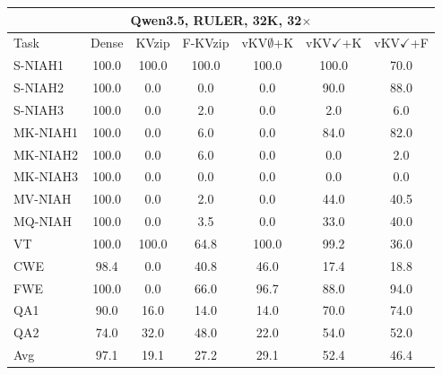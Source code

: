 \begin{tabular}{lcccccc}
\toprule
\multicolumn{7}{c}{Qwen3.5, RULER, 32K, 32$\times$} \\
\midrule
Task & Dense & KVzip & F-KVzip & vKV$\emptyset$+K & vKV$\checkmark$+K & vKV$\checkmark$+F \\
\midrule
S-NIAH1 & 100.0 & 100.0 & 100.0 & 100.0 & 100.0 & 70.0 \\
S-NIAH2 & 100.0 & 0.0 & 0.0 & 0.0 & 90.0 & 88.0 \\
S-NIAH3 & 100.0 & 0.0 & 2.0 & 0.0 & 2.0 & 6.0 \\
MK-NIAH1 & 100.0 & 0.0 & 6.0 & 0.0 & 84.0 & 82.0 \\
MK-NIAH2 & 100.0 & 0.0 & 6.0 & 0.0 & 0.0 & 2.0 \\
MK-NIAH3 & 100.0 & 0.0 & 0.0 & 0.0 & 0.0 & 0.0 \\
MV-NIAH & 100.0 & 0.0 & 2.0 & 0.0 & 44.0 & 40.5 \\
MQ-NIAH & 100.0 & 0.0 & 3.5 & 0.0 & 33.0 & 40.0 \\
VT & 100.0 & 100.0 & 64.8 & 100.0 & 99.2 & 36.0 \\
CWE & 98.4 & 0.0 & 40.8 & 46.0 & 17.4 & 18.8 \\
FWE & 100.0 & 0.0 & 66.0 & 96.7 & 88.0 & 94.0 \\
QA1 & 90.0 & 16.0 & 14.0 & 14.0 & 70.0 & 74.0 \\
QA2 & 74.0 & 32.0 & 48.0 & 22.0 & 54.0 & 52.0 \\
\midrule
Avg & 97.1 & 19.1 & 27.2 & 29.1 & 52.4 & 46.4 \\
\bottomrule
\end{tabular}
\vspace{0.8em}

